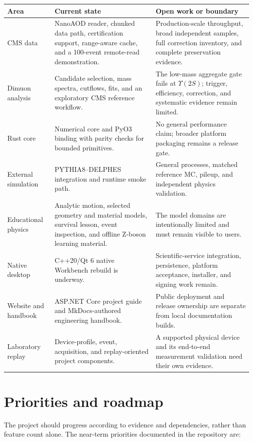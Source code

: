 \documentclass[11pt,a4paper]{article}
\begin{document}
\begin{longtable}{P{0.24\textwidth} P{0.38\textwidth} P{0.30\textwidth}}
\toprule
\textbf{Area} & \textbf{Current state} & \textbf{Open work or boundary} \\
\midrule
\endhead
CMS data &
NanoAOD reader, chunked data path, certification support, range-aware cache,
and a 100-event remote-read demonstration. &
Production-scale throughput, broad independent samples, full correction
inventory, and complete preservation evidence. \\
Dimuon analysis &
Candidate selection, mass spectra, cutflows, fits, and an exploratory CMS
reference workflow. &
The low-mass aggregate gate fails at $\Upsilon(2S)$; trigger, efficiency,
correction, and systematic evidence remain limited. \\
Rust core &
Numerical core and PyO3 binding with parity checks for bounded primitives. &
No general performance claim; broader platform packaging remains a release
gate. \\
External simulation &
PYTHIA8--DELPHES integration and runtime smoke path. &
General processes, matched reference MC, pileup, and independent physics
validation. \\
Educational physics &
Analytic motion, selected geometry and material models, survival lesson,
event inspection, and offline Z-boson learning material. &
The model domains are intentionally limited and must remain visible to users. \\
Native desktop &
C++20/Qt 6 native Workbench rebuild is underway. &
Scientific-service integration, persistence, platform acceptance, installer,
and signing work remain. \\
Website and handbook &
ASP.NET Core project guide and MkDocs-authored engineering handbook. &
Public deployment and release ownership are separate from local documentation
builds. \\
Laboratory replay &
Device-profile, event, acquisition, and replay-oriented project components. &
A supported physical device and its end-to-end measurement validation need
their own evidence. \\
\bottomrule
\end{longtable}

\section{Priorities and roadmap}

The project should progress according to evidence and dependencies, rather than
feature count alone. The near-term priorities documented in the repository are:
\end{document}
